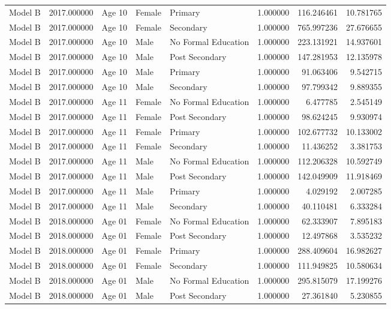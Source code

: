 \begin{table}[ht]
\begin{tabular}{lrlllrrr}
Model B & 2017.000000 & Age 10 & Female & Primary & 1.000000 & 116.246461 & 10.781765 \\
Model B & 2017.000000 & Age 10 & Female & Secondary & 1.000000 & 765.997236 & 27.676655 \\
Model B & 2017.000000 & Age 10 & Male & No Formal Education & 1.000000 & 223.131921 & 14.937601 \\
Model B & 2017.000000 & Age 10 & Male & Post Secondary & 1.000000 & 147.281953 & 12.135978 \\
Model B & 2017.000000 & Age 10 & Male & Primary & 1.000000 & 91.063406 & 9.542715 \\
Model B & 2017.000000 & Age 10 & Male & Secondary & 1.000000 & 97.799342 & 9.889355 \\
Model B & 2017.000000 & Age 11 & Female & No Formal Education & 1.000000 & 6.477785 & 2.545149 \\
Model B & 2017.000000 & Age 11 & Female & Post Secondary & 1.000000 & 98.624245 & 9.930974 \\
Model B & 2017.000000 & Age 11 & Female & Primary & 1.000000 & 102.677732 & 10.133002 \\
Model B & 2017.000000 & Age 11 & Female & Secondary & 1.000000 & 11.436252 & 3.381753 \\
Model B & 2017.000000 & Age 11 & Male & No Formal Education & 1.000000 & 112.206328 & 10.592749 \\
Model B & 2017.000000 & Age 11 & Male & Post Secondary & 1.000000 & 142.049909 & 11.918469 \\
Model B & 2017.000000 & Age 11 & Male & Primary & 1.000000 & 4.029192 & 2.007285 \\
Model B & 2017.000000 & Age 11 & Male & Secondary & 1.000000 & 40.110481 & 6.333284 \\
Model B & 2018.000000 & Age 01 & Female & No Formal Education & 1.000000 & 62.333907 & 7.895183 \\
Model B & 2018.000000 & Age 01 & Female & Post Secondary & 1.000000 & 12.497868 & 3.535232 \\
Model B & 2018.000000 & Age 01 & Female & Primary & 1.000000 & 288.409604 & 16.982627 \\
Model B & 2018.000000 & Age 01 & Female & Secondary & 1.000000 & 111.949825 & 10.580634 \\
Model B & 2018.000000 & Age 01 & Male & No Formal Education & 1.000000 & 295.815079 & 17.199276 \\
Model B & 2018.000000 & Age 01 & Male & Post Secondary & 1.000000 & 27.361840 & 5.230855 \\

\end{tabular}
\end{table}
